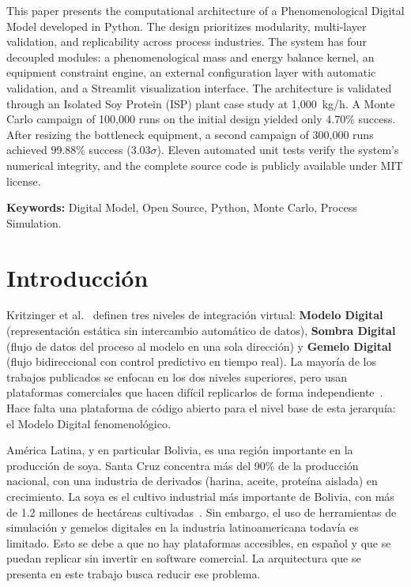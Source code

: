 \documentclass[10pt,letterpaper]{article}
\begin{document}
This paper presents the computational architecture of a Phenomenological Digital Model developed in Python. The design prioritizes modularity, multi-layer validation, and replicability across process industries. The system has four decoupled modules: a phenomenological mass and energy balance kernel, an equipment constraint engine, an external configuration layer with automatic validation, and a Streamlit visualization interface. The architecture is validated through an Isolated Soy Protein (ISP) plant case study at 1,000~kg/h. A Monte Carlo campaign of 100,000 runs on the initial design yielded only 4.70\% success. After resizing the bottleneck equipment, a second campaign of 300,000 runs achieved 99.88\% success (3.03$\sigma$). Eleven automated unit tests verify the system's numerical integrity, and the complete source code is publicly available under MIT license.

\vspace{6pt}
{\fontsize{10}{12}\selectfont\bfseries Keywords:} Digital Model, Open Source, Python, Monte Carlo, Process Simulation.


\section{Introducci\'on}

Kritzinger et al.~\cite{kritzinger2018digital} definen tres niveles de integraci\'on virtual: \textbf{Modelo Digital} (representaci\'on est\'atica sin intercambio autom\'atico de datos), \textbf{Sombra Digital} (flujo de datos del proceso al modelo en una sola direcci\'on) y \textbf{Gemelo Digital} (flujo bidireccional con control predictivo en tiempo real). La mayor\'ia de los trabajos publicados se enfocan en los dos niveles superiores, pero usan plataformas comerciales que hacen dif\'icil replicarlos de forma independiente~\cite{gil2024survey}. Hace falta una plataforma de c\'odigo abierto para el nivel base de esta jerarqu\'ia: el Modelo Digital fenomenol\'ogico.

Am\'erica Latina, y en particular Bolivia, es una regi\'on importante en la producci\'on de soya. Santa Cruz concentra m\'as del 90\% de la producci\'on nacional, con una industria de derivados (harina, aceite, prote\'ina aislada) en crecimiento. La soya es el cultivo industrial m\'as importante de Bolivia, con m\'as de 1.2 millones de hect\'areas cultivadas~\cite{cao2023}. Sin embargo, el uso de herramientas de simulaci\'on y gemelos digitales en la industria latinoamericana todav\'ia es limitado. Esto se debe a que no hay plataformas accesibles, en espa\~nol y que se puedan replicar sin invertir en software comercial. La arquitectura que se presenta en este trabajo busca reducir ese problema.
\end{document}
